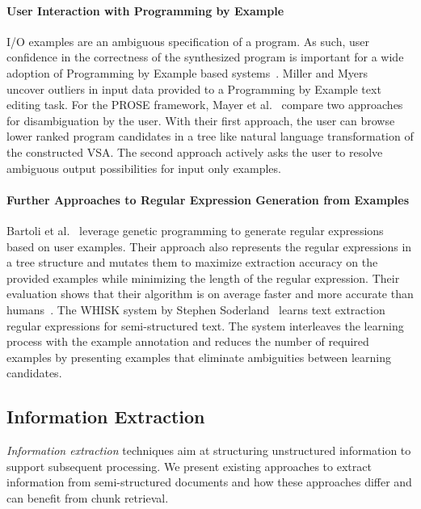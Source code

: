 \documentclass[\myrootdir/main.tex]{subfiles}
\begin{document}
\paragraph{User Interaction with Programming by Example}
I/O examples are an ambiguous specification of a program.
As such, user confidence in the correctness of the synthesized program is important for a wide adoption of Programming by Example based systems~\cite{lau2009why-programming-by-demonstration}.
Miller and Myers~\cite{miller2001outlier} uncover outliers in input data provided to a Programming by Example text editing task.
For the PROSE framework, Mayer et al.~\cite{mayer2015user} compare two approaches for disambiguation by the user.
With their first approach, the user can browse lower ranked program candidates in a tree like natural language transformation of the constructed VSA\@.
The second approach actively asks the user to resolve ambiguous output possibilities for input only examples.


\paragraph{Further Approaches to Regular Expression Generation from Examples}
Bartoli et al.~\cite{bartoli2012automatic} leverage genetic programming to generate regular expressions based on user examples.
Their approach also represents the regular expressions in a tree structure and mutates them to maximize extraction accuracy on the provided examples while minimizing the length of the regular expression.
Their evaluation shows that their algorithm is on average faster and more accurate than humans~\cite{bartoli2016on-the-automatic}.
The WHISK system by Stephen Soderland~\cite{soderland1999learning} learns text extraction regular expressions for semi-structured text.
The system interleaves the learning process with the example annotation and reduces the number of required examples by presenting examples that eliminate ambiguities between learning candidates.

\subsection{Information Extraction} %
\emph{Information extraction} techniques aim at structuring unstructured information to support subsequent processing.
We present existing approaches to extract information from semi-structured documents and how these approaches differ and can benefit from chunk retrieval.
\end{document}
